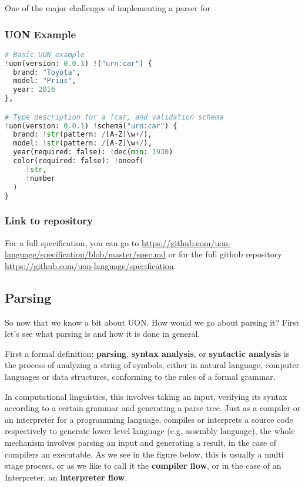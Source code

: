 \documentclass[12pt]{article}
\begin{document}
One of the major challenges of implementing a parser for 

\subsubsection{UON Example}
\begin{lstlisting}[language=python]
# Basic UON example
!uon(version: 0.0.1) !("urn:car") {
  brand: "Toyota",
  model: "Prius",
  year: 2016
},

# Type description for a !car, and validation schema
!uon(version: 0.0.1) !schema("urn:car") {
  brand: !str(pattern: /[A-Z]\w+/),
  model: !str(pattern: /[A-Z]\w+/),
  year(required: false): !dec(min: 1930)
  color(required: false): !oneof(
     !str,
     !number
  )
}
\end{lstlisting}

\subsubsection{Link to repository}
For a full specification, you can go to \url{https://github.com/uon-language/specification/blob/master/spec.md} or for the full github repository \url{https://github.com/uon-language/specification}.

\pagebreak

\subsection{Parsing}
So now that we know a bit about UON. How would we go about parsing it? First let’s see what parsing is and how it is done in general.

First a formal definition: \textbf{parsing}, \textbf{syntax analysis}, or \textbf{syntactic analysis} is the process of analyzing a string of symbols, either in natural language, computer languages or data structures, conforming to the rules of a formal grammar.

In computational linguistics, this involves taking an input, verifying its syntax according to a certain grammar and generating a parse tree. Just as a compiler or an interpreter for a programming language, compiles or interprets a source code respectively to generate lower level language (e.g. assembly language), the whole mechanism involves parsing an input and generating a result, in the case of compilers an executable. As we see in the figure below, this is usually a multi stage process, or as we like to call it the \textbf{compiler flow}, or in the case of an Interpreter, an \textbf{interpreter flow}.
\end{document}
